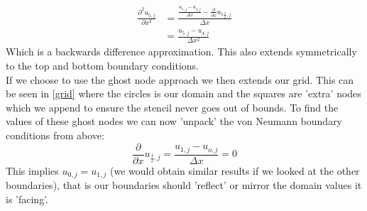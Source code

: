 \begin{align*}
	\frac{\partial^2 u_{5,j}}{\partial x^2} &= \frac{\frac{u_{5,j} - u_{4,j}}{\Delta x} - \frac{\partial}{\partial x}u_{5\frac{1}{2},j}}{\Delta x}\\
	&= \frac{u_{5,j} - u_{4,j}}{\Delta x^2}
\end{align*}
Which is a backwards difference approximation. This also extends symmetrically to the top and bottom boundary conditions.\\
If we choose to use the ghost node approach we then extends our grid. This can be seen in \autoref{grid} where the circles is our domain and the squares are 'extra' nodes which we append to ensure the stencil never goes out of bounds. To find the values of these ghost nodes we can now 'unpack' the von Neumann boundary conditions from above:
\begin{equation*}
	\frac{\partial}{\partial x}u_{\frac{1}{2},j} = \frac{u_{1,j} - u_{o,j}}{\Delta x} = 0
\end{equation*}
This implies $u_{0,j} = u_{1,j}$ (we would obtain similar results if we looked at the other boundaries), that is our boundaries should 'reflect' or mirror the domain values it is 'facing'. 

